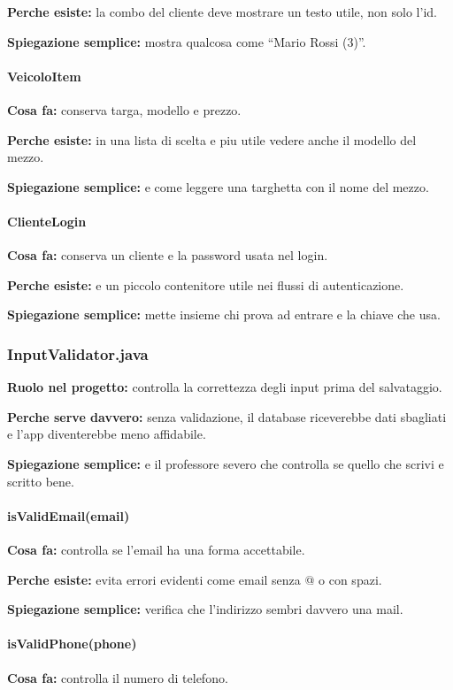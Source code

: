 \documentclass[12pt,a4paper]{article}
\begin{document}
\textbf{Perche esiste:} la combo del cliente deve mostrare un testo utile, non solo l'id.

\textbf{Spiegazione semplice:} mostra qualcosa come ``Mario Rossi (3)''.

\paragraph{VeicoloItem}
\textbf{Cosa fa:} conserva targa, modello e prezzo.

\textbf{Perche esiste:} in una lista di scelta e piu utile vedere anche il modello del mezzo.

\textbf{Spiegazione semplice:} e come leggere una targhetta con il nome del mezzo.

\paragraph{ClienteLogin}
\textbf{Cosa fa:} conserva un cliente e la password usata nel login.

\textbf{Perche esiste:} e un piccolo contenitore utile nei flussi di autenticazione.

\textbf{Spiegazione semplice:} mette insieme chi prova ad entrare e la chiave che usa.

\subsubsection*{InputValidator.java}
\textbf{Ruolo nel progetto:} controlla la correttezza degli input prima del salvataggio.

\textbf{Perche serve davvero:} senza validazione, il database riceverebbe dati sbagliati e l'app diventerebbe meno affidabile.

\textbf{Spiegazione semplice:} e il professore severo che controlla se quello che scrivi e scritto bene.

\paragraph{isValidEmail(email)}
\textbf{Cosa fa:} controlla se l'email ha una forma accettabile.

\textbf{Perche esiste:} evita errori evidenti come email senza @ o con spazi.

\textbf{Spiegazione semplice:} verifica che l'indirizzo sembri davvero una mail.

\paragraph{isValidPhone(phone)}
\textbf{Cosa fa:} controlla il numero di telefono.
\end{document}
